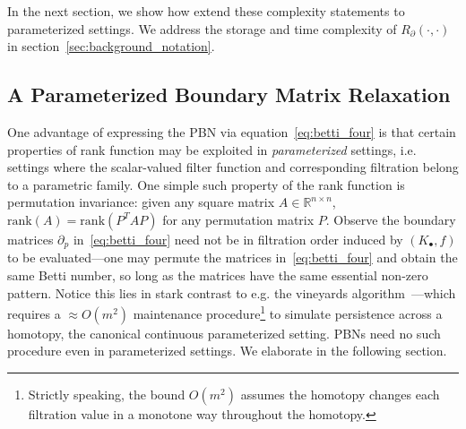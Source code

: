 \documentclass[10pt]{article}
\newcommand{\+}{%
	\raisebox{0.18ex}{\scaleobj{0.55}{+}}
}
\begin{document}
\noindent 
In the next section, we show how extend these complexity statements to parameterized settings. We address the storage and time complexity of $R_\partial(\cdot, \cdot)$ in section~\ref{sec:background_notation}.

\subsection{A Parameterized Boundary Matrix Relaxation}
One advantage of expressing the PBN via equation~\eqref{eq:betti_four} is that certain properties of rank function may be exploited in \emph{parameterized} settings, i.e. settings where the scalar-valued filter function and corresponding filtration belong to a parametric family.  
One simple such property of the rank function is permutation invariance: given any square matrix $A \in \mathbb{R}^{n \times n}$, $\mathrm{rank}(A) = \mathrm{rank}(P^T A P)$ for any permutation matrix $P$. Observe the boundary matrices $\partial_p$ in~\eqref{eq:betti_four} need not be in filtration order induced by $(K_\bullet, f)$ to be evaluated---one may permute the matrices in~\eqref{eq:betti_four} and obtain the same Betti number, so long as the matrices have the same essential non-zero pattern. 
Notice this lies in stark contrast to e.g. the vineyards algorithm~\cite{cohen2006vines}---which requires a $\approx O(m^2)$ maintenance procedure\footnote{Strictly speaking, the bound $O(m^2)$ assumes the homotopy changes each filtration value in a monotone way throughout the homotopy. } to simulate persistence across a homotopy, the canonical continuous parameterized setting. PBNs need no such procedure even in parameterized settings. 
We elaborate in the following section. 
\end{document}
